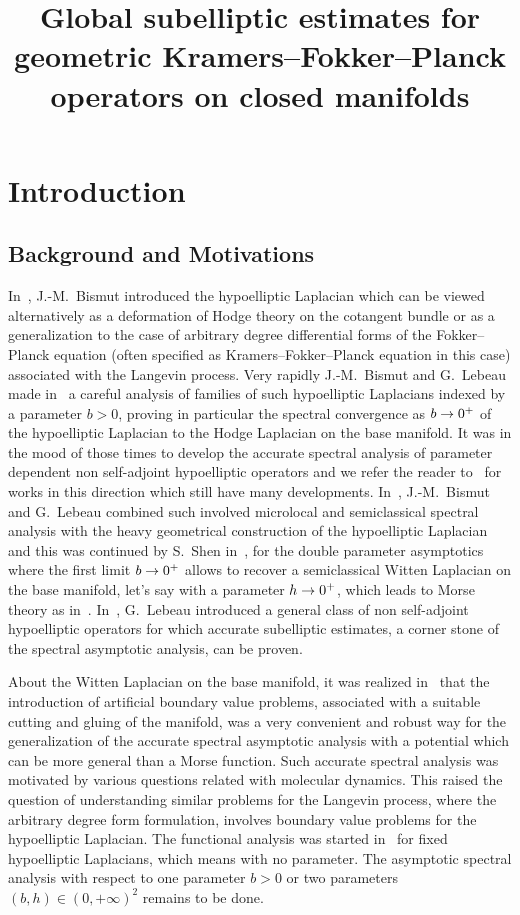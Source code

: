 \documentclass[AHL,Unicode,longabstracts]{cedram}
\title[Global subellipticity for GKFP operators]{Global subelliptic estimates for geometric Kramers--Fokker--Planck operators on closed manifolds}
\author[\initial{F.} \lastname{Nier}]{\firstname{Francis} \lastname{Nier}}
\author[\initial{X.} \lastname{Sang}]{\firstname{Xingfeng} \lastname{Sang}}
\author[\initial{F.G.} \lastname{White}]{\firstname{Francis} \lastname{White}}
\renewcommand*{\to}{\mathchoice{\longrightarrow}{\rightarrow}{\rightarrow}{\rightarrow}}
\begin{document}
\maketitle

\tableofcontents

\section{Introduction}

\subsection{Background and Motivations}

In~\cite{Bis042,Bis041,Bis05}, J.-M.~Bismut introduced the hypoelliptic Laplacian which can be viewed alternatively as a deformation of Hodge theory on the cotangent bundle or as a generalization to the case of arbitrary degree differential forms of the Fokker--Planck equation (often specified as Kramers--Fokker--Planck equation in this case) associated with the Langevin process. Very rapidly J.-M.~Bismut and G.~Lebeau made in~\cite{BiLe} a careful analysis of families of such hypoelliptic Laplacians indexed by a parameter $b>0$, proving in particular the spectral convergence as $b\to 0^{+}$ of the hypoelliptic Laplacian to the Hodge Laplacian on the base manifold. It was in the mood of those times to develop the accurate spectral analysis of parameter dependent non self-adjoint hypoelliptic operators and we refer the reader to~\cite{Dav,DSZ,HerNi,HHS} for works in this direction which still have many developments. In~\cite{BiLe}, J.-M.~Bismut and G.~Lebeau combined such involved microlocal and semiclassical spectral analysis with the heavy geometrical construction of the hypoelliptic Laplacian and this was continued by S.~Shen in~\cite{She}, for the double parameter asymptotics where the first limit $b\to 0^{+}$ allows to recover a semiclassical Witten Laplacian on the base manifold, let's say with a parameter $h\to 0^{+}$, which leads to Morse theory as in~\cite{HeSj4,Wit,Zha}. In~\cite{Leb1,Leb2}, G.~Lebeau introduced a general class of non self-adjoint hypoelliptic operators for which accurate subelliptic estimates, a corner stone of the spectral asymptotic analysis, can be proven.

About the Witten Laplacian on the base manifold, it was realized in~\cite{LNV2,LNV1} that the introduction of artificial boundary value problems, associated with a suitable cutting and gluing of the manifold, was a very convenient and robust way for the generalization of the accurate spectral asymptotic analysis with a potential which can be more general than a Morse function. Such accurate spectral analysis was motivated by various questions related with molecular dynamics. This raised the question of understanding similar problems for the Langevin process, where the arbitrary degree form formulation, involves boundary value problems for the hypoelliptic Laplacian. The functional analysis was started in~\cite{Nie,NiSh} for fixed hypoelliptic Laplacians, which means with no parameter. The asymptotic spectral analysis with respect to one parameter $b>0$ or two parameters $(b,h)\in (0,+\infty)^{2}$ remains to be done.
\end{document}
